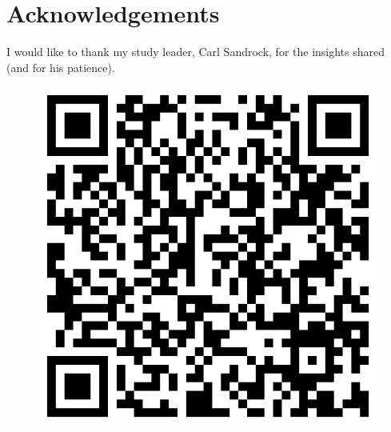 \chapter*{Acknowledgements}

I would like to thank my study leader, Carl Sandrock, for the insights shared (and for his patience).
\vfill

\begin{figure}[b]
  \centering
  \includegraphics[scale=0.2]{graph/qrcode}
\end{figure}

